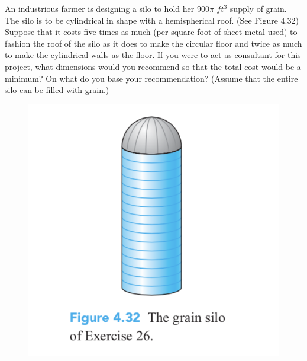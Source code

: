 \documentclass[12pt,letterpaper]{hmcpset}
\begin{document}
\begin{problem}[Colley 4.3.26]
An industrious farmer is designing a silo to hold her
$900\pi$ $ft^3$ supply of grain. The silo is to be cylindrical in shape with a hemispherical roof. (See Figure 4.32) Suppose that it costs five times as much (per square foot of sheet metal used) to fashion the roof of the silo as it does to make the circular floor and twice as much to make the cylindrical walls as the floor. If you were to act as consultant for this project, what dimensions would you recommend so that the total cost would be a minimum? On what do you base your recommendation? (Assume that the entire silo can be filled with grain.)
\end{problem}
  \begin{figure}[ht]
    \centering
    \includegraphics[scale=0.6]{assets/12_1.png}
  \end{figure}
\clearpage
\end{document}
